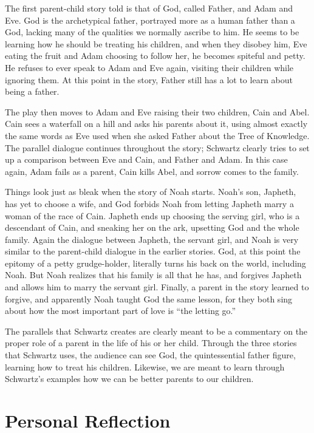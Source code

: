 \documentclass[onecolumn, 12pt]{article}
\begin{document}
The first parent-child story told is that of God, called Father, and Adam and
Eve.  God is the archetypical father, portrayed more as a human father than a
God, lacking many of the qualities we normally ascribe to him.  He seems to be
learning how he should be treating his children, and when they disobey him, Eve
eating the fruit and Adam choosing to follow her, he becomes spiteful and
petty.  He refuses to ever speak to Adam and Eve again, visiting their children
while ignoring them.  At this point in the story, Father still has a lot to
learn about being a father.

The play then moves to Adam and Eve raising their two children, Cain and Abel.
Cain sees a waterfall on a hill and asks his parents about it, using almost
exactly the same words as Eve used when she asked Father about the Tree of
Knowledge.  The parallel dialogue continues throughout the story; Schwartz
clearly tries to set up a comparison between Eve and Cain, and Father and Adam.
In this case again, Adam fails as a parent, Cain kills Abel, and sorrow comes
to the family.

Things look just as bleak when the story of Noah starts.  Noah's son, Japheth,
has yet to choose a wife, and God forbids Noah from letting Japheth marry a
woman of the race of Cain.  Japheth ends up choosing the serving girl, who is a
descendant of Cain, and sneaking her on the ark, upsetting God and the whole
family.  Again the dialogue between Japheth, the servant girl, and Noah is very
similar to the parent-child dialogue in the earlier stories.  God, at this
point the epitomy of a petty grudge-holder, literally turns his back on the
world, including Noah.  But Noah realizes that his family is all that he has,
and forgives Japheth and allows him to marry the servant girl.  Finally, a
parent in the story learned to forgive, and apparently Noah taught God the same
lesson, for they both sing about how the most important part of love is ``the
letting go.''

The parallels that Schwartz creates are clearly meant to be a commentary on the
proper role of a parent in the life of his or her child.  Through the three
stories that Schwartz uses, the audience can see God, the quintessential father
figure, learning how to treat his children.  Likewise, we are meant to learn
through Schwartz's examples how we can be better parents to our children.

\section*{Personal Reflection}
\end{document}
